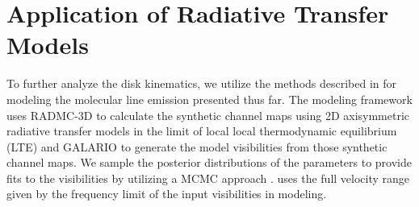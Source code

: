 
\section{Application of Radiative Transfer Models}\label{sec:kmodelresults}
To further analyze the disk kinematics, we utilize the methods described in \citet{2019ApJ...874..136S} %
for modeling the molecular line emission presented thus far. The modeling framework uses RADMC-3D \citep{2012ascl.soft02015D} to calculate the synthetic channel maps using 2D axisymmetric radiative transfer models in  the limit of local local thermodynamic equilibrium (LTE)  and GALARIO \citep{2018MNRAS.476.4527T} to generate the model visibilities from those synthetic channel maps. We sample the posterior distributions of the parameters to provide fits to the visibilities by utilizing a MCMC approach 
\citep[\pdspy; ][]{2019ApJ...874..136S}. \pdspy\space uses the full velocity range given by the frequency limit of the input visibilities in modeling.



